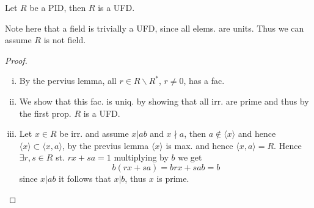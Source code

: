\begin{theorem}
  Let $R$ be a PID, then $R$ is a UFD.
\end{theorem}
\begin{remark}
  Note here that a field is trivially a UFD, since all elems. are units. Thus we can assume $R$ is not field.
\end{remark}
\begin{proof}\
  \begin{enumerate}[i)]
      \item By the pervius lemma, all $r \in R \backslash R^{*}$, $r \neq 0$, has a fac.
      \item We show that this fac. is uniq. by showing that all irr. are prime and thus by the first prop. $R$ is a UFD.
      \item Let $x \in R$ be irr. and assume $x | ab$ and $x \nmid a$, then $a \not \in \langle x \rangle$ and hence $\langle x \rangle \subset \langle x, a \rangle$, by the previus lemma $\langle x \rangle$ is max. and hence $\langle x, a \rangle = R$. Hence $\exists r, s \in R$ st. $rx + sa = 1$ multiplying by $b$ we get
      \begin{equation*}
        b(rx + sa) = brx + sab = b
      \end{equation*}
      since $x | ab$ it follows that $x | b$, thus $x$ is prime.
  \end{enumerate}
\end{proof}

